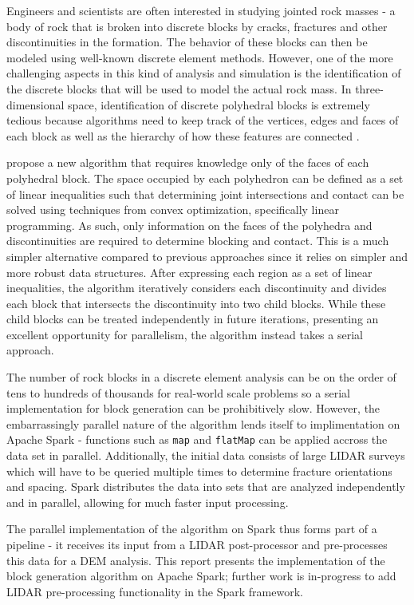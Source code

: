 Engineers and scientists are often interested in studying jointed rock masses - a body of rock that is broken into discrete blocks by cracks, fractures and other discontinuities in the formation. The behavior of these blocks can then be modeled using well-known discrete element methods. However, one of the more challenging aspects in this kind of analysis and simulation is the identification of the discrete blocks that will be used to model the actual rock mass. In three-dimensional space, identification of discrete polyhedral blocks is extremely tedious because algorithms need to keep track of the vertices, edges and faces of each block as well as the hierarchy of how these features are connected \cite{slicing}. \par

\cite{slicing} propose a new algorithm that requires knowledge only of the faces of each polyhedral block. The space occupied by each polyhedron can be defined as a set of linear inequalities such that determining joint intersections and contact can be solved using techniques from convex optimization, specifically linear programming. As such, only information on the faces of the polyhedra and discontinuities are required to determine blocking and contact. This is a much simpler alternative compared to previous approaches since it relies on simpler and more robust data structures. After expressing each region as a set of linear inequalities, the algorithm iteratively considers each discontinuity and divides each block that intersects the discontinuity into two child blocks. While these child blocks can be treated independently in future iterations, presenting an excellent opportunity for parallelism, the algorithm instead takes a serial approach. \par

The number of rock blocks in a discrete element analysis can be on the order of tens to hundreds of thousands for real-world scale problems so a serial implementation for block generation can be prohibitively slow. However, the embarrassingly parallel nature of the algorithm lends itself to implimentation on Apache Spark - functions such as \texttt{map} and \texttt{flatMap} can be applied accross the data set in parallel. Additionally, the initial data consists of large LIDAR surveys which will have to be queried multiple times to determine fracture orientations and spacing. Spark distributes the data into sets that are analyzed independently and in parallel, allowing for much faster input processing. \par

The parallel implementation of the \cite{slicing} algorithm on Spark thus forms part of a pipeline - it receives its input from a LIDAR post-processor and pre-processes this data for a DEM analysis. This report presents the implementation of the block generation algorithm on Apache Spark; further work is in-progress to add LIDAR pre-processing functionality in the Spark framework.
